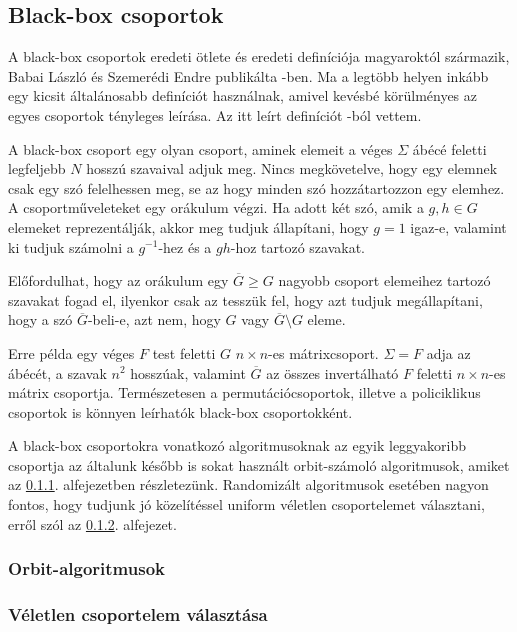 \subsection{Black-box csoportok}
\label{subsec:blackbox}
A black-box csoportok eredeti ötlete és eredeti definíciója magyaroktól származik,
Babai László és Szemerédi Endre publikálta \cite{BS84}-ben.
Ma a legtöbb helyen inkább egy kicsit általánosabb definíciót használnak, amivel kevésbé körülményes az
egyes csoportok tényleges leírása. Az itt leírt definíciót \cite{Ser03}-ból vettem.

A black-box csoport egy olyan csoport,
aminek elemeit a véges $\Sigma$ ábécé feletti legfeljebb $N$ hosszú szavaival adjuk meg.
Nincs megkövetelve, hogy egy elemnek csak egy szó felelhessen meg, se az hogy minden szó hozzátartozzon
egy elemhez.
A csoportműveleteket egy orákulum végzi.
Ha adott két szó, amik a $g, h\in G$ elemeket reprezentálják,
akkor meg tudjuk állapítani, hogy $g=1$ igaz-e,
valamint ki tudjuk számolni a $g^{-1}$-hez és a $gh$-hoz tartozó szavakat.

Előfordulhat, hogy az orákulum egy $\overline{G} \ge G$ nagyobb csoport elemeihez tartozó szavakat fogad el,
ilyenkor csak az tesszük fel, hogy azt tudjuk megállapítani, hogy a szó $\overline{G}$-beli-e,
azt nem, hogy $G$ vagy $\overline{G}\setminus G$ eleme.

Erre példa egy véges $F$ test feletti $G$ $n\times n$-es mátrixcsoport.
$\Sigma=F$ adja az ábécét, a szavak $n^2$ hosszúak,
valamint $\overline{G}$ az összes invertálható $F$ feletti $n\times n$-es mátrix csoportja.
Természetesen a permutációcsoportok, illetve a policiklikus csoportok is könnyen leírhatók black-box csoportokként.

A black-box csoportokra vonatkozó algoritmusoknak az egyik leggyakoribb csoportja az általunk később is sokat használt
orbit-számoló algoritmusok, amiket az \ref{subsubsec:orbit}. alfejezetben részletezünk.
Randomizált algoritmusok esetében nagyon fontos, hogy tudjunk jó közelítéssel uniform véletlen csoportelemet választani,
erről szól az \ref{subsubsec:veletlen}. alfejezet.

\subsubsection{Orbit-algoritmusok}
\label{subsubsec:orbit}

\subsubsection{Véletlen csoportelem választása}
\label{subsubsec:veletlen}